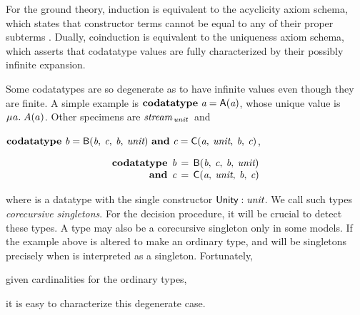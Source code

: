 For the ground theory, induction is equivalent to the acyclicity
axiom schema, which states that constructor terms cannot be equal to
any of their proper subterms \cite{barrett-et-al-2007}. Dually, coinduction
is equivalent to the uniqueness axiom schema, which asserts that codatatype
values are fully characterized by their possibly infinite expansion.




{
Some codatatypes are so degenerate as to have infinite values
even though they are finite. A simple example is
\vthinspace$\textbf{codatatype}~\textit{a} = \textsf{A}(\textit{a})$, whose
unique value is $\MU a.\; A(a)$. Other specimens are
$\textit{stream}_{\,\textit{unit}\,}$
and
\begin{conf}%
\vthinspace$\textbf{codatatype}~\textit{b} = \textsf{B}(\textit{b},\: \textit{c},\: \textit{b},\: \textit{unit})
~\textbf{and}~ \textit{c} = \textsf{C}(\textit{a},\: \textit{unit},\: \textit{b},\: \textit{c})$,
\end{conf}%
\begin{rep}%
\[\begin{aligned}[t]
      \textbf{codatatype}\;\, \textit{b} & \,=\, \textsf{B}(\textit{b},\: \textit{c},\: \textit{b},\: \textit{unit}) \\[-1\jot]
      \textbf{and}\;\, \textit{c} & \,=\, \textsf{C}(\textit{a},\: \textit{unit},\: \textit{b},\: \textit{c})
\end{aligned}
\]
\end{rep}%
where  is a datatype with the single constructor $\textsf{Unity} :
\textit{unit}$. We call such types
\emph{corecursive singletons}. For the decision procedure, it will be
crucial to detect these types. %
A type may also be a corecursive singleton only in some models. If the example
above is altered to make  an ordinary type,  and  will be
singletons precisely when  is interpreted as a singleton.
Fortunately, \begin{rep}given cardinalities for the ordinary types, \end{rep}%
it is easy to characterize this degenerate case.

}

